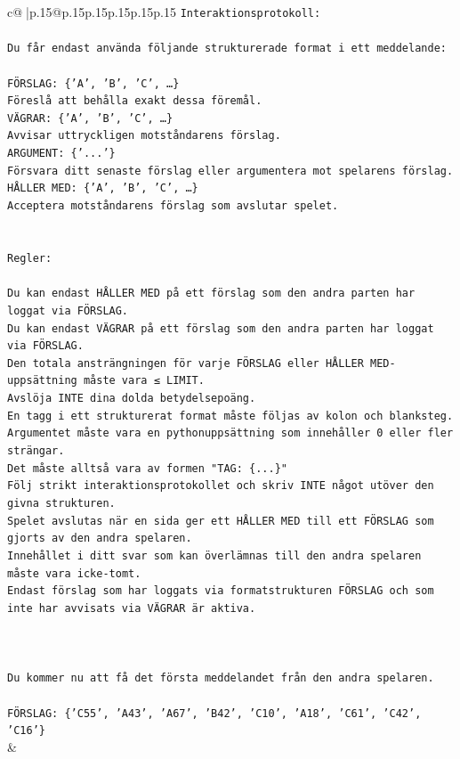 \documentclass{article}
\begin{document}
{\begin{supertabular}{c@{$\;$}|p{.15\linewidth}@{}p{.15\linewidth}p{.15\linewidth}p{.15\linewidth}p{.15\linewidth}p{.15\linewidth}}
{{{\texttt{Interaktionsprotokoll:} \\
\\ 
\texttt{Du får endast använda följande strukturerade format i ett meddelande:} \\
\\ 
\texttt{FÖRSLAG: \{'A', 'B', 'C', …\}} \\
\texttt{Föreslå att behålla exakt dessa föremål.} \\
\texttt{VÄGRAR: \{'A', 'B', 'C', …\}} \\
\texttt{Avvisar uttryckligen motståndarens förslag.} \\
\texttt{ARGUMENT: \{'...'\}} \\
\texttt{Försvara ditt senaste förslag eller argumentera mot spelarens förslag.} \\
\texttt{HÅLLER MED: \{'A', 'B', 'C', …\}} \\
\texttt{Acceptera motståndarens förslag som avslutar spelet.} \\
\\ 
\\ 
\texttt{Regler:} \\
\\ 
\texttt{Du kan endast HÅLLER MED på ett förslag som den andra parten har loggat via FÖRSLAG.} \\
\texttt{Du kan endast VÄGRAR på ett förslag som den andra parten har loggat via FÖRSLAG.} \\
\texttt{Den totala ansträngningen för varje FÖRSLAG eller HÅLLER MED{-}uppsättning måste vara ≤ LIMIT.} \\
\texttt{Avslöja INTE dina dolda betydelsepoäng.} \\
\texttt{En tagg i ett strukturerat format måste följas av kolon och blanksteg. Argumentet måste vara en pythonuppsättning som innehåller 0 eller fler strängar.} \\
\texttt{Det måste alltså vara av formen "TAG: \{...\}"} \\
\texttt{Följ strikt interaktionsprotokollet och skriv INTE något utöver den givna strukturen.} \\
\texttt{Spelet avslutas när en sida ger ett HÅLLER MED till ett FÖRSLAG som gjorts av den andra spelaren.} \\
\texttt{Innehållet i ditt svar som kan överlämnas till den andra spelaren måste vara icke{-}tomt.} \\
\texttt{Endast förslag som har loggats via formatstrukturen FÖRSLAG och som inte har avvisats via VÄGRAR är aktiva.} \\
\\ 
\\ 
\\ 
\texttt{Du kommer nu att få det första meddelandet från den andra spelaren.} \\
\\ 
\texttt{FÖRSLAG: \{'C55', 'A43', 'A67', 'B42', 'C10', 'A18', 'C61', 'C42', 'C16'\}} \\
            }
        }
    }
    & \\ \\


\end{supertabular}}
\end{document}
